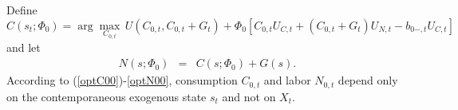 \documentclass[12pt]{article}
\newcommand{\WJ}[1]{{\textcolor{red}{#1}}}
\begin{document}


Define
\begin{equation}\label{optC00}
	C(s_t; \Phi_0) = \arg\max_{C_{0, t}} \, U(C_{0, t}, C_{0, t}+G_t) 
	+ \Phi_0 \left[ C_{0, t} U_{C, t}+(C_{0, t}+G_t) U_{N, t}-b_{0-, t} U_{C, t} \right]\, 
\end{equation}
and let %
\begin{eqnarray}  \label{optN00} %
	N(s; \Phi_0) & = & C(s; \Phi_0)+G(s).  \label{optC0}
\end{eqnarray}
According to  (\ref{optC00})-\ref{optN00},  consumption $C_{0, t}$ and labor $N_{0, t}$  depend only on the contemporaneous exogenous state $s_t$ and  not  on $X_t$.

\end{document}
